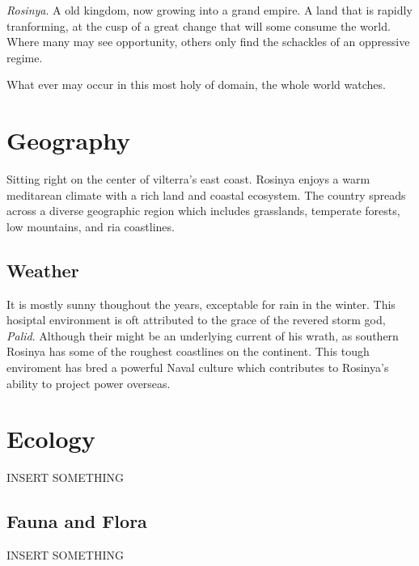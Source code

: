 \documentclass[../main.tex]{subfiles}
\begin{document}

\emph{Rosinya}. A old kingdom, now growing into a grand empire. A land that is rapidly tranforming, 
at the cusp of a great change that will some consume the world. 
Where many may see opportunity, others only find the schackles of an oppressive regime.

What ever may occur in this most holy of domain, the whole world watches. 



\section{Geography} 
Sitting right on the center of vilterra's east coast. Rosinya enjoys a warm meditarean climate
with a rich land and coastal ecosystem. The country spreads across a diverse geographic
region which includes grasslands, temperate forests, low mountains, and ria coastlines.

\subsection{Weather} 
It is mostly sunny thoughout the years, exceptable for rain in the winter. 
This hosiptal environment is oft attributed to the grace of the revered 
storm god, \emph{Palid}. Although their might be an underlying current of his wrath,
as southern Rosinya has some of the roughest coastlines on the continent.
This tough enviroment has bred a powerful Naval culture which contributes 
to Rosinya's ability to project power overseas. 



\section{Ecology}
INSERT SOMETHING

\subsection{Fauna and Flora}
INSERT SOMETHING
\end{document}
